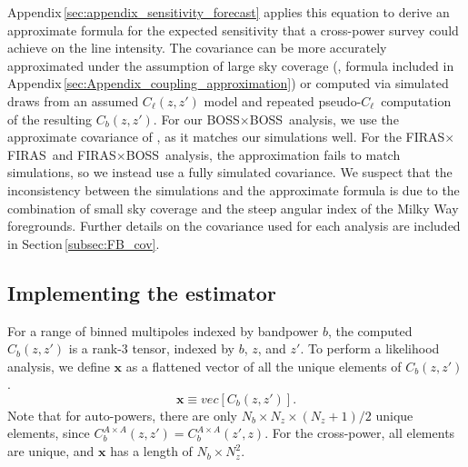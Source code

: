\documentclass[fleqn,usenatbib]{mnras}
\newcommand{\pcl}{pseudo-$C_{\ell}$}
\newcommand{\FF}{FIRAS${\times}$FIRAS}
\newcommand{\BB}{BOSS${\times}$BOSS}
\newcommand{\FB}{FIRAS${\times}$BOSS}
\begin{document}
Appendix\,\ref{sec:appendix_sensitivity_forecast} applies this equation to derive an approximate formula for the expected sensitivity that a cross-power survey could achieve on the line intensity. The covariance can be more accurately approximated under the assumption of large sky coverage (\cite{tristram2005xspect}, formula included in Appendix\,\ref{sec:Appendix_coupling_approximation}) or computed via simulated draws from an assumed $C_{\ell}(z,z')$ model and repeated \pcl\ computation of the resulting $C_b(z,z')$. For our \BB\ analysis, we use the approximate covariance of \cite{tristram2005xspect}, as it matches our simulations well.
For the \FF\ and \FB\ analysis, the approximation fails to match simulations, so we instead use a fully simulated covariance. We suspect that the inconsistency between the simulations and the approximate formula is due to the combination of small sky coverage and the steep angular index of the Milky Way foregrounds. Further details on the covariance used for each analysis are included in Section\,\ref{subsec:FB_cov}.

\subsection{Implementing the estimator}
\label{subsec:implementing_estimator}

For a range of binned multipoles indexed by bandpower $b$, the computed $C_{b}(z,z')$ is a rank-3 tensor, indexed by $b$, $z$, and $z'$. To perform a likelihood analysis, we define $\mathbf{x}$ as a flattened vector of all the unique elements of $C_{b}(z,z')$. 
\begin{equation}
\mathbf{x} \equiv vec [C_{b}(z,z')].
\end{equation}
Note that for auto-powers, there are only $N_{b} \times N_z \times (N_z+1)/2$ unique elements, since $C_{b}^{A \times A}(z,z') = C_{b}^{A \times A}(z',z)$. For the cross-power, all elements are unique, and $\mathbf{x}$ has a length of $N_{b} \times N_z^2$. 
\end{document}
